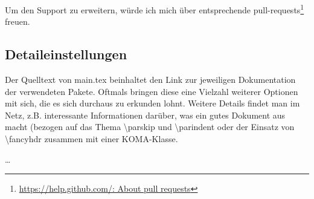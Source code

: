 Um den Support zu erweitern, würde ich mich über entsprechende pull-requests\footnote{\href{https://help.github.com/en/articles/about-pull-requests}{https://help.github.com/: About pull requests}} freuen.

\subsection{Detaileinstellungen}
Der Quelltext von main.tex beinhaltet den Link zur jeweiligen Dokumentation der verwendeten Pakete. Oftmals bringen diese eine Vielzahl weiterer Optionen mit sich, die es sich durchaus zu erkunden lohnt.
Weitere Details findet man im Netz, z.B.  interessante Informationen darüber, was ein gutes Dokument aus macht (bezogen auf das Thema \textbackslash parskip und \textbackslash parindent oder der Einsatz von \textbackslash fancyhdr zusammen mit einer KOMA-Klasse.

\dots
